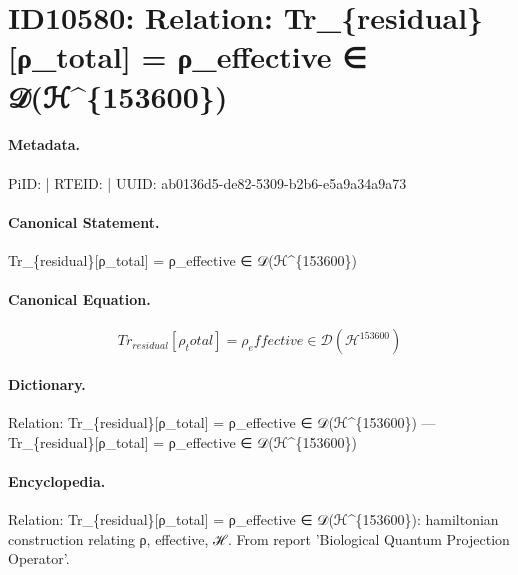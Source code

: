 \section*{ID10580: Relation: Tr\_\{residual\}[ρ\_total] = ρ\_effective ∈ 𝒟(ℋ\textasciicircum{}\{153600\})}
\paragraph{Metadata.}
PiID:  | RTEID:  | UUID: ab0136d5-de82-5309-b2b6-e5a9a34a9a73

\paragraph{Canonical Statement.}
Tr\_\{residual\}[ρ\_total] = ρ\_effective ∈ 𝒟(ℋ\textasciicircum{}\{153600\})

\paragraph{Canonical Equation.}
\[
Tr_{residual}[ρ_total] = ρ_effective ∈ 𝒟(ℋ^{153600})
\]

\paragraph{Dictionary.}
Relation: Tr\_\{residual\}[ρ\_total] = ρ\_effective ∈ 𝒟(ℋ\textasciicircum{}\{153600\}) — Tr\_\{residual\}[ρ\_total] = ρ\_effective ∈ 𝒟(ℋ\textasciicircum{}\{153600\})

\paragraph{Encyclopedia.}
Relation: Tr\_\{residual\}[ρ\_total] = ρ\_effective ∈ 𝒟(ℋ\textasciicircum{}\{153600\}): hamiltonian construction relating ρ, effective, ℋ. From report 'Biological Quantum Projection Operator'.
